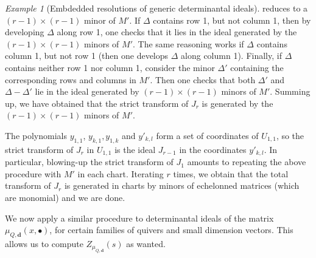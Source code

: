 \documentclass[11pt,english]{article}
\numberwithin{equation}{section}
\numberwithin{figure}{section}
\theoremstyle{definition}
\theoremstyle{plain}
\theoremstyle{remark}
\newtheorem{exmp}[df]{Example}
\newcommand\dd{\mathbf{d}}
\begin{document}
\begin{exmp}[Embdedded resolutions of generic determinantal ideals]
reduces to a $(r-1)\times(r-1)$ minor of $M'$. If $\Delta$ contains
row 1, but not column 1, then by developing $\Delta$ along row 1,
one checks that it lies in the ideal generated by the $(r-1)\times(r-1)$
minors of $M'$. The same reasoning works if $\Delta$ contains column
1, but not row 1 (then one develops $\Delta$ along column 1). Finally,
if $\Delta$ contains neither row 1 nor column 1, consider the minor
$\Delta'$ containing the corresponding rows and columns in $M'$.
Then one checks that both $\Delta'$ and $\Delta-\Delta'$ lie in
the ideal generated by $(r-1)\times(r-1)$ minors of $M'$. Summing
up, we have obtained that the strict transform of $J_{r}$ is generated
by the $(r-1)\times(r-1)$ minors of $M'$.

The polynomials $y_{1,1}$, $y_{k,1},y_{1,k}$ and $y'_{k,l}$ form
a set of coordinates of $U_{1,1}$, so the strict transform of $J_{r}$
in $U_{1,1}$ is the ideal $J_{r-1}$ in the coordinates $y'_{k,l}$.
In particular, blowing-up the strict transform of $J_{1}$ amounts
to repeating the above procedure with $M'$ in each chart. Iterating
$r$ times, we obtain that the total transform of $J_{r}$ is generated
in charts by minors of echelonned matrices (which are monomial) and
we are done.

\end{exmp}

We now apply a similar procedure to determinantal ideals of the matrix
$\mu_{Q,\dd}(x,\bullet)$, for certain families of quivers and small
dimension vectors. This allows us to compute $Z_{\mu_{Q,\dd}}(s)$
as wanted.
\end{document}
